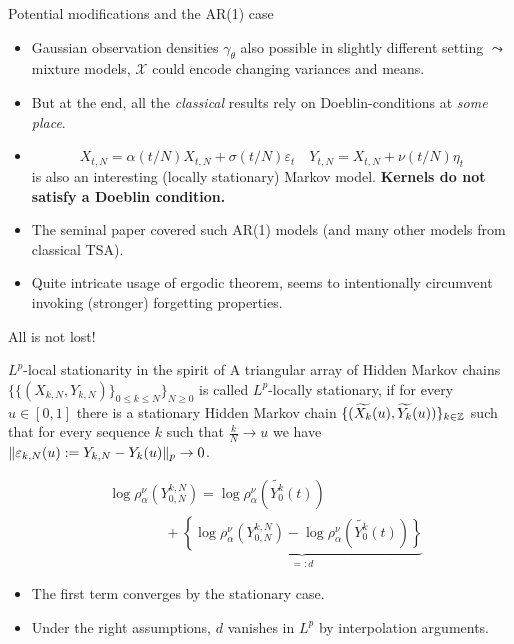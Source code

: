 \begin{frame}{Potential modifications and the AR(1) case}
	\begin{itemize}
		\item Gaussian observation densities $\gamma_\theta$ also possible in slightly different setting $\leadsto$ mixture models, $\mathcal{X}$ could encode changing variances and means. 
		\item But at the end, all the \textit{classical} results rely on Doeblin-conditions at \textit{some place}. \pause
		\item \[
		X_{t,N} = \alpha(t/N) X_{t,N} + \sigma(t/N) \varepsilon_t \quad Y_{t,N} = X_{t,N} + \nu(t/N) \eta_t
		\] is also an interesting (locally stationary) Markov model. \textbf{Kernels do not satisfy a Doeblin condition. }
		\pause
		\item The seminal paper \cite{douc_moulines_olsson_vanhandel2011consistency} covered such AR(1) models (and many other models from classical TSA). 
		\item Quite intricate usage of ergodic theorem, seems to intentionally circumvent invoking (stronger) forgetting properties. 
	\end{itemize}
\end{frame}

\begin{frame}{All is not lost!}
	\begin{definitionblockname}{$L^p$-local stationarity in the spirit of \cite{Dahlhaus2012locally}}
	A triangular array of Hidden Markov chains $\{\{(X_{k,N}, Y_{k,N})\}_{0 \leq k \leq N}\}_{N \geq 0}$ is called $L^p$-locally stationary, if for every $u \in [0,1]$ there is a stationary Hidden Markov chain $\{(\widetilde{X_k}(u), \widetilde{Y_k}(u))\}_{k \in \mathbb{Z}}$ such that for every sequence $k$ such that $\frac{k}{N} \to u$ we have $\lVert\varepsilon_{k,N}(u):= Y_{k,N}-Y_k(u)\rVert_p \to 0$.  
	\end{definitionblockname}
	\pause
	\vspace{-0.3cm}
	\begin{align*}
	& \log \rho_{\alpha}^\nu(Y_{0,N}^{k,N}) = \log \rho_{\alpha}^\nu(\widetilde{Y_{0}^k}(t)) \\  & \qquad \qquad +  \underbrace{\left\{\log \rho_{\alpha}^\nu(Y_{0,N}^{k,N}) - \log \rho_{\alpha}^\nu(\widetilde{Y_{0}^k}(t))\right\}}_{=:d}
	\end{align*}
	\vspace{-0.3cm}
	\pause
	\begin{itemize}
		\item The first term converges by the stationary case.
		\item Under the right assumptions, $d$ vanishes in $L^p$ by interpolation arguments.
	\end{itemize}
\end{frame}

